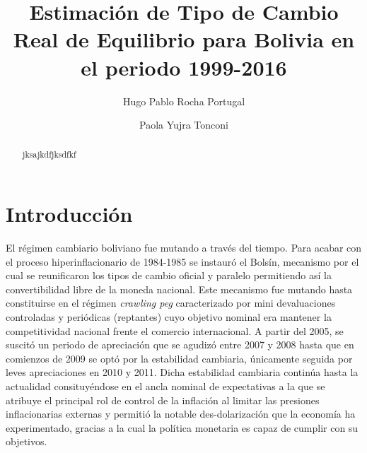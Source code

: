 \documentclass[12pt,letterpaper]{article}
\title{Estimación de Tipo de Cambio Real de Equilibrio para Bolivia en el periodo 1999-2016}
\author{Hugo Pablo Rocha Portugal \and Paola Yujra Tonconi}
\date{}
\begin{document}
 

\maketitle 

\begin{abstract}
jksajkdfjksdfkf
\end{abstract}

\newpage

\section{Introducción}

El régimen cambiario boliviano fue mutando a través del tiempo. Para acabar con el proceso hiperinflacionario de 1984-1985 se instauró el Bolsín, mecanismo por el cual se reunificaron los tipos de cambio oficial y paralelo permitiendo así la convertibilidad libre de la moneda nacional. Este mecanismo fue mutando hasta constituirse en el régimen \emph{crawling peg} caracterizado por mini devaluaciones controladas y periódicas (reptantes) cuyo objetivo nominal era mantener la competitividad nacional frente el comercio internacional. A partir del 2005, se suscitó un periodo de apreciación que se agudizó entre 2007 y 2008 hasta que en comienzos de 2009 se optó por la estabilidad cambiaria, únicamente seguida por leves apreciaciones en 2010 y 2011. Dicha estabilidad cambiaria continúa hasta la actualidad consituyéndose en el ancla nominal de expectativas a la que se atribuye el principal rol de control de la inflación al limitar las presiones inflacionarias externas y permitió la notable des-dolarización que la economía ha experimentado, gracias a la cual la política monetaria es capaz de cumplir con su objetivos.
\end{document}
